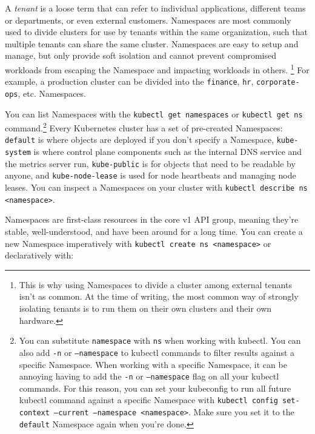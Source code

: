 \documentclass[table, xcdraw]{article}%
\begin{document}
A \emph{tenant} is a loose term that can refer to individual applications, different teams or departments, or even external customers. Namespaces are most commonly used to divide clusters for use by tenants within the same organization, such that multiple tenants can share the same cluster. Namespaces are easy to setup and manage, but only provide soft isolation and cannot prevent compromised workloads from escaping the Namespace and impacting workloads in others. \footnote{This is why using Namespaces to divide a cluster among external tenants isn’t as common. At the time of writing, the most common way of strongly isolating tenants is to run them on their own clusters and their own hardware.} For example, a production cluster can be divided into the \texttt{finance}, \texttt{hr}, \texttt{corporate-ops}, etc. Namespaces.

You can list Namespaces with the \texttt{kubectl get namespaces} or \texttt{kubectl get ns} command.\footnote{You can substitute \texttt{namespace} with \texttt{ns} when working with kubectl. You can also add \texttt{-n} or \texttt{--namespace} to kubectl commands to filter results against a specific Namespace. When working with a specific Namespace, it can be annoying having to add the \texttt{-n} or \texttt{--namespace} flag on all your kubectl commands. For this reason, you can set your kubeconfig to run all future kubectl command against a specific Namespace with \texttt{kubectl config set-context --current --namespace <namespace>}. Make sure you set it to the \texttt{default} Namespace again when you're done.} Every Kubernetes cluster has a set of pre-created Namespaces: \texttt{default} is where objects are deployed if you don't specify a Namespace, \texttt{kube-system} is where control plane components such as the internal DNS service and the metrics server run, \texttt{kube-public} is for objects that need to be readable by anyone, and \texttt{kube-node-lease} is used for node heartbeats and managing node leases. You can inspect a Namespaces on your cluster with \texttt{kubectl describe ns <namespace>}.

Namespaces are first-class resources in the core v1 API group, meaning they’re stable, well-understood, and have been around for a long time. You can create a new Namespace imperatively with \texttt{kubectl create ns <namespace>} or declaratively with:
\end{document}
